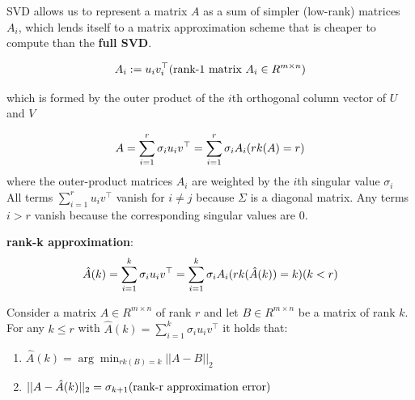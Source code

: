 SVD allows us to represent a matrix $A$ as a sum of simpler (low-rank) matrices $A_i$, which lends itself to a matrix approximation scheme that is cheaper to compute than the \textbf{full SVD}.

\[
    A_i := u_iv_i^\top \hfill \text{(rank-$1$ matrix $A_i \in R^{m\times n}$)}
\]

which is formed by the outer product of the $i$th orthogonal column vector of $U$ and $V$

\[
    \displaystyle
    A = 
    \sum_{i=1}^{r} \sigma_iu_iv^\top
    =
    \sum_{i=1}^{r} \sigma_iA_i
    \hfill
    (rk(A)=r)
\]
where the outer-product matrices $A_i$ are weighted by the $i$th singular value $\sigma_i$\\
All terms $\displaystyle \sum_{i=1}^{r} u_iv^\top$ vanish for $i \neq j$ because $\Sigma$ is a diagonal matrix. Any terms $i > r$ vanish because the corresponding singular values are $0$.

\vspace{0.2cm}
\textbf{rank-k approximation}:
\[
    \displaystyle
    \hat{A}(k) = 
    \sum_{i=1}^{k} \sigma_iu_iv^\top
    =
    \sum_{i=1}^{k} \sigma_iA_i
    \hfill
    (rk(\hat{A}(k))=k)
    (k < r)
\]

\begin{theorem}
    Consider a matrix $A \in R^{m\times n}$ of rank $r$ and let $B \in R^{m\times n}$ be a matrix of rank $k$. For any $k \leq r$ with $\hat{A}(k) = \sum_{i=1}^{k} \sigma_iu_iv^\top$ it holds that:
    \begin{enumerate}
        \item $\displaystyle \hat{A}(k) = \arg\min_{rk(B)=k} ||A-B||_2$

        \item $\displaystyle ||A-\hat{A}(k)||_2 = \sigma_{k+1} \hfill (\text{rank-r approximation error})$
    \end{enumerate}
\end{theorem}

